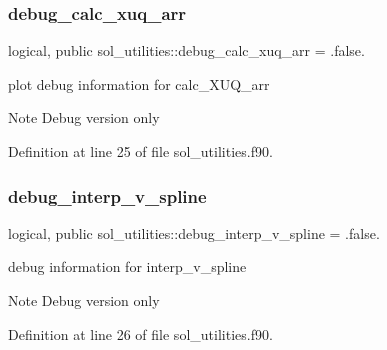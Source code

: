 \subsubsection{\texorpdfstring{debug\+\_\+calc\+\_\+xuq\+\_\+arr}{debug\_calc\_xuq\_arr}}
{\footnotesize\ttfamily logical, public sol\+\_\+utilities\+::debug\+\_\+calc\+\_\+xuq\+\_\+arr = .false.}



plot debug information for calc\+\_\+\+X\+U\+Q\+\_\+arr 

\begin{DoxyNote}{Note}
Debug version only 
\end{DoxyNote}


Definition at line 25 of file sol\+\_\+utilities.\+f90.

\mbox{\label{namespacesol__utilities_aa36c52e73c02a783074c7c0e5076c903}} 
\subsubsection{\texorpdfstring{debug\+\_\+interp\+\_\+v\+\_\+spline}{debug\_interp\_v\_spline}}
{\footnotesize\ttfamily logical, public sol\+\_\+utilities\+::debug\+\_\+interp\+\_\+v\+\_\+spline = .false.}



debug information for interp\+\_\+v\+\_\+spline 

\begin{DoxyNote}{Note}
Debug version only 
\end{DoxyNote}


Definition at line 26 of file sol\+\_\+utilities.\+f90.

